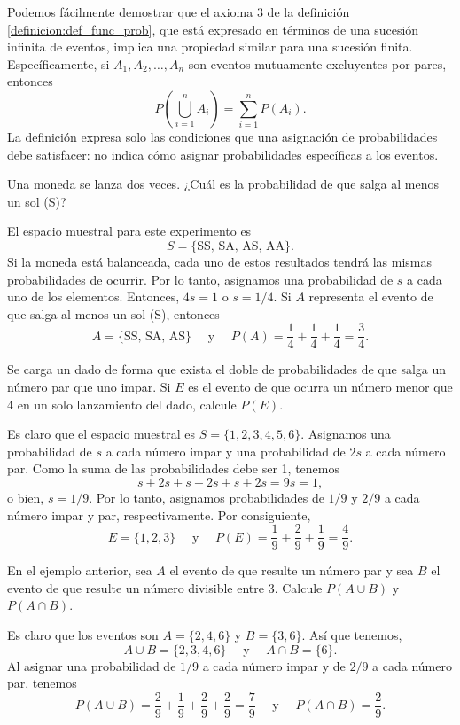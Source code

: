 \newpage

Podemos fácilmente demostrar que el axioma 3 de la definición \ref{definicion:def_func_prob}, que está expresado en términos de una sucesión infinita de eventos, implica una propiedad similar para una sucesión finita. Específicamente, si $A_1, A_2, \dots, A_n$ son eventos mutuamente excluyentes por pares, entonces
$$P\left( \bigcup_{i = 1}^{n} A_i \right) = \sum_{i = 1}^{n} P(A_i).$$
La definición expresa solo las condiciones que una asignación de probabilidades debe satisfacer: no indica cómo asignar probabilidades específicas a los eventos.

\begin{examplebox}{}{}
    Una moneda se lanza dos veces. ¿Cuál es la probabilidad de que salga al menos un sol (S)?
    
    \tcblower
    \solucion El espacio muestral para este experimento es
    $$S = \{ \text{SS, SA, AS, AA} \}.$$
    Si la moneda está balanceada, cada uno de estos resultados tendrá las mismas probabilidades de ocurrir. Por lo tanto, asignamos una probabilidad de $s$ a cada uno de los elementos. Entonces, $4s = 1$ o $s = 1/4$. Si $A$ representa el evento de que salga al menos un sol (S), entonces
    $$A = \{ \text{SS, SA, AS} \} \quad \text{ y } \quad P(A) = \frac{1}{4} + \frac{1}{4} + \frac{1}{4} = \frac{3}{4}.$$
\end{examplebox}

\begin{examplebox}{}{}
    Se carga un dado de forma que exista el doble de probabilidades de que salga un número par que uno impar. Si $E$ es el evento de que ocurra un número menor que 4 en un solo lanzamiento del dado, calcule $P(E)$.
    
    \tcblower
    \solucion Es claro que el espacio muestral es $S = \{1, 2, 3, 4, 5, 6\}$. Asignamos una probabilidad de $s$ a cada número impar y una probabilidad de $2s$ a cada número par. Como la suma de las probabilidades debe ser 1, tenemos
    $$s + 2s + s + 2s + s + 2s = 9s = 1,$$
    o bien, $s = 1/9$. Por lo tanto, asignamos probabilidades de $1/9$ y $2/9$ a cada número impar y par, respectivamente. Por consiguiente,
    $$E = \{ 1, 2, 3 \} \quad \text{ y } \quad P(E) = \frac{1}{9} + \frac{2}{9} + \frac{1}{9} = \frac{4}{9}.$$
\end{examplebox}

\begin{examplebox}{}{}
    En el ejemplo anterior, sea $A$ el evento de que resulte un número par y sea $B$ el evento de que resulte un número divisible entre 3. Calcule $P(A \cup B)$ y $P(A \cap B)$.
    
    \tcblower
    \solucion Es claro que los eventos son $A = \{2, 4, 6\}$ y $B = \{3, 6\}$. Así que tenemos,
    $$A \cup B = \{ 2, 3, 4, 6 \} \quad \text{ y } \quad A \cap B = \{ 6 \}.$$
    Al asignar una probabilidad de $1/9$ a cada número impar y de $2/9$ a cada número par, tenemos
    $$P(A \cup B) = \frac{2}{9} + \frac{1}{9} + \frac{2}{9} + \frac{2}{9} = \frac{7}{9} \quad \text{ y } \quad P(A \cap B) = \frac{2}{9}.$$
\end{examplebox}

